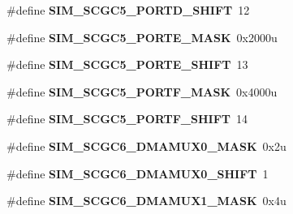 \begin{DoxyCompactItemize}
\item 
\hypertarget{group___s_i_m___register___masks_gad5f267781fcedf0fcdc0c4d3607c10cb}{}\#define {\bfseries S\+I\+M\+\_\+\+S\+C\+G\+C5\+\_\+\+P\+O\+R\+T\+D\+\_\+\+S\+H\+I\+F\+T}~12\label{group___s_i_m___register___masks_gad5f267781fcedf0fcdc0c4d3607c10cb}

\item 
\hypertarget{group___s_i_m___register___masks_ga3d5e3e51d345fe424a4f24aa9ae73dc1}{}\#define {\bfseries S\+I\+M\+\_\+\+S\+C\+G\+C5\+\_\+\+P\+O\+R\+T\+E\+\_\+\+M\+A\+S\+K}~0x2000u\label{group___s_i_m___register___masks_ga3d5e3e51d345fe424a4f24aa9ae73dc1}

\item 
\hypertarget{group___s_i_m___register___masks_gae717813cf38c35e5e4ea4243e939b4bc}{}\#define {\bfseries S\+I\+M\+\_\+\+S\+C\+G\+C5\+\_\+\+P\+O\+R\+T\+E\+\_\+\+S\+H\+I\+F\+T}~13\label{group___s_i_m___register___masks_gae717813cf38c35e5e4ea4243e939b4bc}

\item 
\hypertarget{group___s_i_m___register___masks_ga6cfeac1a00843b6a818adc0088766f0a}{}\#define {\bfseries S\+I\+M\+\_\+\+S\+C\+G\+C5\+\_\+\+P\+O\+R\+T\+F\+\_\+\+M\+A\+S\+K}~0x4000u\label{group___s_i_m___register___masks_ga6cfeac1a00843b6a818adc0088766f0a}

\item 
\hypertarget{group___s_i_m___register___masks_gaa8ffceaa1be6d82fda9a396c38028282}{}\#define {\bfseries S\+I\+M\+\_\+\+S\+C\+G\+C5\+\_\+\+P\+O\+R\+T\+F\+\_\+\+S\+H\+I\+F\+T}~14\label{group___s_i_m___register___masks_gaa8ffceaa1be6d82fda9a396c38028282}

\item 
\hypertarget{group___s_i_m___register___masks_ga1aec9f7358829c265b833a933a85d752}{}\#define {\bfseries S\+I\+M\+\_\+\+S\+C\+G\+C6\+\_\+\+D\+M\+A\+M\+U\+X0\+\_\+\+M\+A\+S\+K}~0x2u\label{group___s_i_m___register___masks_ga1aec9f7358829c265b833a933a85d752}

\item 
\hypertarget{group___s_i_m___register___masks_ga86cc17a488e55b9e68b0cef1c168a440}{}\#define {\bfseries S\+I\+M\+\_\+\+S\+C\+G\+C6\+\_\+\+D\+M\+A\+M\+U\+X0\+\_\+\+S\+H\+I\+F\+T}~1\label{group___s_i_m___register___masks_ga86cc17a488e55b9e68b0cef1c168a440}

\item 
\hypertarget{group___s_i_m___register___masks_ga0c8b14456eab9fa79d89deebd8d76ad1}{}\#define {\bfseries S\+I\+M\+\_\+\+S\+C\+G\+C6\+\_\+\+D\+M\+A\+M\+U\+X1\+\_\+\+M\+A\+S\+K}~0x4u\label{group___s_i_m___register___masks_ga0c8b14456eab9fa79d89deebd8d76ad1}


\end{DoxyCompactItemize}
